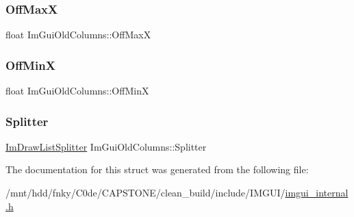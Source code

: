 \subsubsection{\texorpdfstring{Off\+MaxX}{OffMaxX}}
{\footnotesize\ttfamily float Im\+Gui\+Old\+Columns\+::\+Off\+MaxX}

\mbox{\label{structImGuiOldColumns_a7cbfefcc82a7ca3271c8c0c05cfe9ed4}} 
\subsubsection{\texorpdfstring{Off\+MinX}{OffMinX}}
{\footnotesize\ttfamily float Im\+Gui\+Old\+Columns\+::\+Off\+MinX}

\mbox{\label{structImGuiOldColumns_a0bbefb48400e92ca8245dd62bdea7de3}} 
\subsubsection{\texorpdfstring{Splitter}{Splitter}}
{\footnotesize\ttfamily \hyperlink{structImDrawListSplitter}{Im\+Draw\+List\+Splitter} Im\+Gui\+Old\+Columns\+::\+Splitter}



The documentation for this struct was generated from the following file\+:\begin{DoxyCompactItemize}
\item 
/mnt/hdd/fnky/\+C0de/\+C\+A\+P\+S\+T\+O\+N\+E/clean\+\_\+build/include/\+I\+M\+G\+U\+I/\hyperlink{imgui__internal_8h}{imgui\+\_\+internal.\+h}\end{DoxyCompactItemize}
